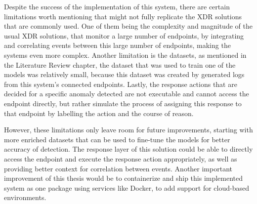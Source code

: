 \documentclass[12pt,a4paper]{report}
\begin{document}
Despite the success of the implementation of this system, there are certain limitations worth
mentioning that might not fully replicate the XDR solutions that are commonly used. One of them
being the complexity and magnitude of the usual XDR solutions, that monitor a large number of
endpoints, by integrating and correlating events between this large number of endpoints, making
the systems even more complex. Another limitation is the datasets, as mentioned in the Literature
Review chapter, the dataset that was used to train one of the models was relatively small,
because this dataset was created by generated logs from this system's connected endpoints.
Lastly, the response actions that are decided for a specific anomaly detected are not executable
and cannot access the endpoint directly, but rather simulate the process of assigning this
response to that endpoint by labelling the action and the course of reason.

However, these limitations only leave room for future improvements, starting with more enriched
datasets that can be used to fine-tune the models for better accuracy of detection. The response
layer of this solution could be able to directly access the endpoint and execute the response
action appropriately, as well as providing better context for correlation between events. Another
important improvement of this thesis would be to containerize and ship this implemented system
as one package using services like Docker, to add support for cloud-based environments.
\end{document}

